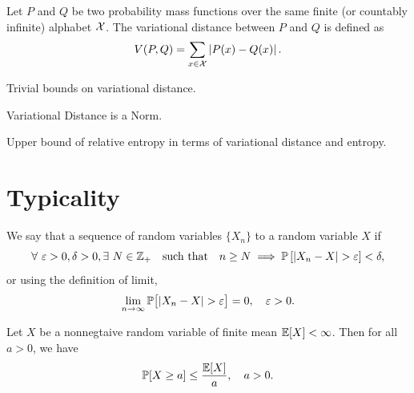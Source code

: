 \documentclass[11pt,a4paper]{article}
\begin{document}
\begin{definition}
    Let $P$ and $Q$ be two probability mass functions over the same finite (or countably infinite) alphabet $\mathcal{X}$. The variational distance between $P$ and $Q$ is defined as 
    \begin{equation*}
        V(P,Q) = \sum_{x\in\mathcal{X}} \left|P(x) -Q(x)\right|.
    \end{equation*}
\end{definition}

\begin{remark}
    Trivial bounds on variational distance.
\end{remark}

\begin{remark}
    Variational Distance is a Norm.
\end{remark}

\begin{theorem}
    Upper bound of relative entropy in terms of variational distance and entropy.
\end{theorem}

\begin{theorem}

\end{theorem}


\section{Typicality}

\begin{definition}
    We say that a sequence of random variables $\{X_n\}$  to a random variable $X$ if
    \begin{equation*}
        \forall\ \varepsilon > 0, \delta>0, \exists\ N\in\mathbb{Z}_+ \quad \text{such that} \quad  n\ge N \implies \mathbb{P}\left[|X_n - X| > \varepsilon \right] < \delta,
    \end{equation*}
    or using the definition of limit, 
    \begin{equation*}
       \lim_{n\rightarrow \infty} \mathbb{P}\big[ |X_n - X| > \varepsilon \big] = 0, \quad \varepsilon >0.
    \end{equation*}
\end{definition}

\begin{lemma}
    Let $X$ be a nonnegtaive random variable of finite mean $\mathbb{E}[X]<\infty$. Then for all $a>0$, we have
    \begin{equation*}
        \mathbb{P}[X\ge a] \le \dfrac{\mathbb{E}[X]}{a},\quad a > 0.
    \end{equation*}
\end{lemma}
\end{document}
